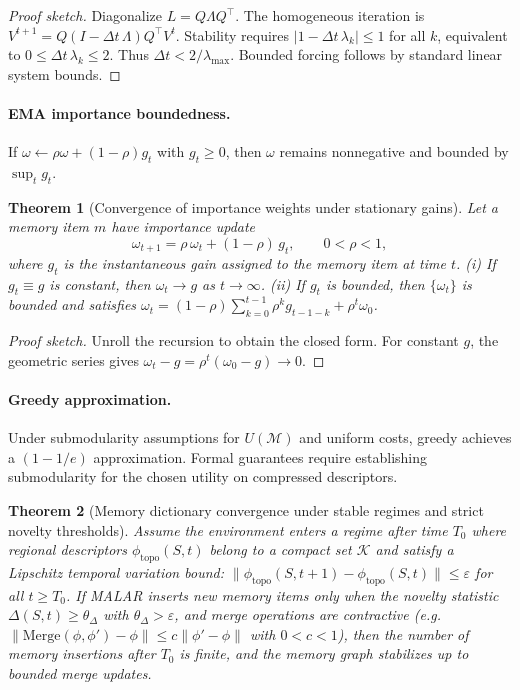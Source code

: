 \documentclass[11pt,english]{article}
\newtheorem{theorem}{Theorem}
\theoremstyle{remark}
\newcommand{\phitopo}{\phi_{\mathrm{topo}}}
\newcommand{\Merge}{\mathrm{Merge}}
\begin{document}
\begin{proof}[Proof sketch]
	Diagonalize $L=Q\Lambda Q^\top$. The homogeneous iteration is $V^{t+1}=Q(I-\Delta t\,\Lambda)Q^\top V^t$.
	Stability requires $|1-\Delta t\,\lambda_k|\le 1$ for all $k$, equivalent to $0\le \Delta t\,\lambda_k \le 2$.
	Thus $\Delta t <2/\lambda_{\max}$. Bounded forcing follows by standard linear system bounds.
\end{proof}


\paragraph{EMA importance boundedness.} If $\omega\leftarrow \rho\omega+(1-\rho)g_t$ with $g_t\ge 0$, then $\omega$ remains nonnegative and bounded
by $\sup_t g_t$.

\begin{theorem}[Convergence of importance weights under stationary gains]
	\label{thm:ema-convergence}
	Let a memory item $m$ have importance update
	\[
	\omega_{t+1} = \rho\,\omega_t + (1-\rho)\,g_t,
	\qquad 0<\rho<1,
	\]
	where $g_t$ is the instantaneous gain assigned to the memory item at time $t$.
	(i) If $g_t \equiv g$ is constant, then $\omega_t \to g$ as $t\to\infty$.
	(ii) If $g_t$ is bounded, then $\{\omega_t\}$ is bounded and satisfies
	$\omega_t = (1-\rho)\sum_{k=0}^{t-1}\rho^{k}g_{t-1-k}+\rho^t\omega_0$.
\end{theorem}

\begin{proof}[Proof sketch]
	Unroll the recursion to obtain the closed form. For constant $g$, the geometric series gives $\omega_t-g=\rho^t(\omega_0-g)\to 0$.
\end{proof}


\paragraph{Greedy approximation.} Under submodularity assumptions for $U(\mathcal{M})$ and uniform costs, greedy achieves a $(1-1/e)$ approximation.
Formal guarantees require establishing submodularity for the chosen utility on compressed descriptors.

\begin{theorem}[Memory dictionary convergence under stable regimes and strict novelty thresholds]
	\label{thm:memory-dictionary}
	Assume the environment enters a regime after time $T_0$ where regional descriptors $\phitopo(S,t)$
	belong to a compact set $\mathcal{K}$ and satisfy a Lipschitz temporal variation bound:
	$\|\phitopo(S,t+1)-\phitopo(S,t)\|\le \varepsilon$ for all $t\ge T_0$.
	If MALAR inserts new memory items only when the novelty statistic
	$\Delta(S,t)\ge \theta_\Delta$ with $\theta_\Delta > \varepsilon$, and merge operations are contractive
	(e.g.\ $\|\Merge(\phi,\phi')-\phi\|\le c\|\phi'-\phi\|$ with $0<c<1$),
	then the number of memory insertions after $T_0$ is finite, and the memory graph stabilizes up to bounded merge updates.
\end{theorem}
\end{document}
